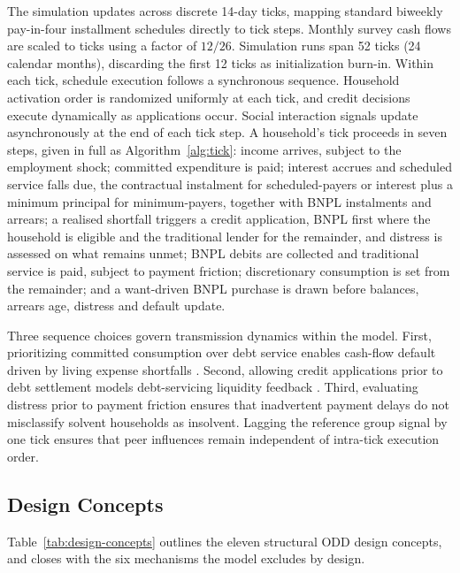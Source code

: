 The simulation updates across discrete 14-day ticks, mapping standard biweekly pay-in-four installment schedules directly to tick steps.
Monthly survey cash flows are scaled to ticks using a factor of $12/26$.
Simulation runs span 52 ticks (24 calendar months), discarding the first 12 ticks as initialization burn-in.
Within each tick, schedule execution follows a synchronous sequence.
Household activation order is randomized uniformly at each tick, and credit decisions execute dynamically as applications occur.
Social interaction signals update asynchronously at the end of each tick step.
A household's tick proceeds in seven steps, given in full as Algorithm~\ref{alg:tick}: income arrives, subject to the employment shock; committed expenditure is paid; interest accrues and scheduled service falls due, the contractual instalment for scheduled-payers or interest plus a minimum principal for minimum-payers, together with \ac{BNPL} instalments and arrears; a realised shortfall triggers a credit application, \ac{BNPL} first where the household is eligible and the traditional lender for the remainder, and distress is assessed on what remains unmet; \ac{BNPL} debits are collected and traditional service is paid, subject to payment friction; discretionary consumption is set from the remainder; and a want-driven \ac{BNPL} purchase is drawn before balances, arrears age, distress and default update.

Three sequence choices govern transmission dynamics within the model.
First, prioritizing committed consumption over debt service enables cash-flow default driven by living expense shortfalls \cite{madeira2018chile}.
Second, allowing credit applications prior to debt settlement models debt-servicing liquidity feedback \cite{dorazio2017micro}.
Third, evaluating distress prior to payment friction ensures that inadvertent payment delays do not misclassify solvent households as insolvent.
Lagging the reference group signal by one tick ensures that peer influences remain independent of intra-tick execution order.

\subsection{Design Concepts}
\label{sec:design-concepts}

Table~\ref{tab:design-concepts} outlines the eleven structural \ac{ODD} design concepts, and closes with the six mechanisms the model excludes by design.

